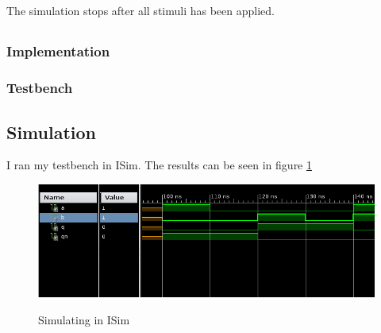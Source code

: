 \documentclass[english,a4paper]{report}
\begin{document}
\subsection{}
The simulation stops after all stimuli has been applied.

\newpage
\subsection{}
\subsubsection{Implementation}

\newpage
\subsubsection{Testbench}

\newpage
\subsection*{Simulation}
I ran my testbench in ISim. The results can be seen in figure \ref{img:isim}

\begin{figure}[h!]
\includegraphics[width=14cm]{simulation.png}
\label{img:isim}
\caption{Simulating in ISim}
\end{figure}
\end{document}
